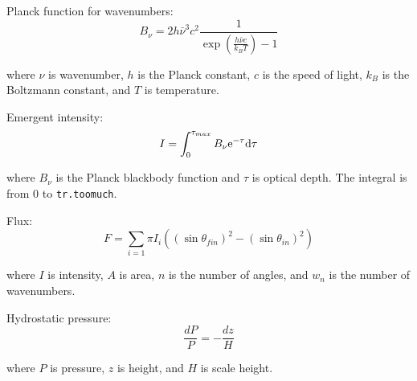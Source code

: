 \documentclass[letterpaper,12pt]{article}
\begin{document}
\noindent
Planck function for wavenumbers:
\begin{equation}
\label{eqn:planck}
B_\nu = 2 h {\bar\nu}^3 c^2 \frac{1}{\exp(\frac{h \bar \nu c}{k_B T})-1}
\end{equation}

\noindent
where $\nu$ is wavenumber, $h$ is the Planck constant, $c$ is the speed of light, $k_B$ is the Boltzmann constant, and $T$ is temperature. \newline

\noindent
Emergent intensity:
\begin{equation}
\label{eqn:intens}
I = \int_0\sp{\tau\sb{max}} B_\nu \mathrm{e}^{-\tau} \mathrm{d}\tau
\end{equation}

\noindent
where $B_\nu$ is the Planck blackbody function and $\tau$ is optical depth. The integral is from $0$ to {\tt tr.toomuch}.

\noindent
Flux:
\begin{equation}
\label{eqn:flux}
F = \sum\limits_{i=1} \pi I_i ((\sin{\theta_{fin}})^2 - (\sin{\theta_{in}})^2)
\end{equation}

\noindent
where $I$ is intensity, $A$ is area, $n$ is the number of angles, and $w_n$ is the number of wavenumbers.

\noindent
Hydrostatic pressure:
\begin{equation}
\label{eqn:hydrostatic}
\frac{dP}{P} = -\frac{dz}{H}
\end{equation}

\noindent
where $P$ is pressure, $z$ is height, and $H$ is scale height.

\end{document}
